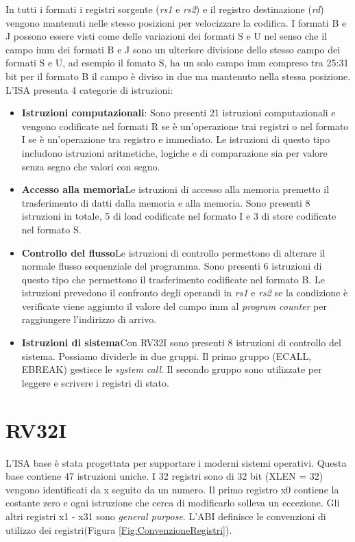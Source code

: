 \documentclass[12pt, a4paper]{report}
\begin{document}
In tutti i formati i registri sorgente (\textit{rs1} e \textit{rs2}) e il registro destinazione (\textit{rd}) vengono mantenuti nelle stesso posizioni per velocizzare la codifica.
I formati B e J possono essere visti come delle variazioni dei formati S e U nel senso che il campo imm dei formati B e J sono un ulteriore divisione dello stesso campo dei formati S e U, ad esempio il fomato S, ha un solo campo imm compreso tra 25:31 bit per il formato B il campo è diviso in due ma mantenuto nella stessa posizione. L'ISA presenta 4 categorie di istruzioni:
\begin{itemize}
	\item \textbf{Istruzioni computazionali}: Sono presenti 21 istruzioni computazionali e vengono codificate nel formati R se è un'operazione trai registri o nel formato I se è un'operazione tra registro e immediato. Le istruzioni di questo tipo includono istruzioni aritmetiche, logiche e di comparazione sia per valore senza segno che valori con segno.
	\item \textbf{Accesso alla memoria}Le istruzioni di accesso alla memoria premetto il trasferimento di datti dalla memoria e alla memoria. Sono presenti 8 istruzioni in totale, 5 di load codificate nel formato I e 3 di store codificate nel formato S.
	\item \textbf{Controllo del flusso}Le istruzioni di controllo permettono di alterare il normale flusso sequenziale del programma. Sono presenti 6 istruzioni di questo tipo che permettono il trasferimento codificate nel formato B. Le istruzioni prevedono il confronto degli operandi in \textit{rs1} e \textit{rs2} se la condizione è verificate viene aggiunto il valore del campo imm al \textit{program counter} per raggiungere l'indirizzo di arrivo.
	\item \textbf{Istruzioni di sistema}Con RV32I sono presenti 8 istruzioni di controllo del sistema. Possiamo dividerle in due gruppi. Il primo gruppo (ECALL, EBREAK) gestisce le \textit{system call}. Il secondo gruppo sono utilizzate per leggere e scrivere i registri di stato.
\end{itemize}


\section{RV32I}
L'ISA base è stata progettata per supportare i moderni sistemi operativi. Questa base contiene 47 istruzioni uniche. I 32 registri sono di 32 bit (XLEN = 32) vengono identificati da x seguito da un numero. Il primo registro x0 contiene la costante zero e ogni istruzione che cerca di modificarlo solleva un eccezione. Gli altri registri x1 - x31 sono \textit{general purpose}. L'ABI definisce le convenzioni di utilizzo dei registri(Figura \ref{Fig:ConvenzioneRegistri}).
\end{document}
